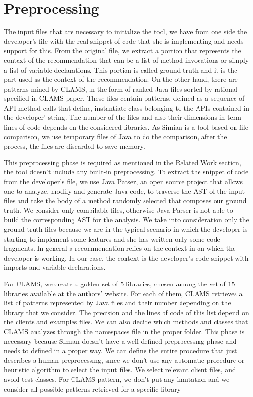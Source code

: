 \section{Preprocessing}

The input files that are necessary to initialize the tool, we have from one side the developer's file with the real snippet of code that she is implementing and needs support for this. From the original file, we extract a portion that represents the context of the recommendation that can be a list of method invocations or simply a list of variable declarations. This portion is called ground truth and it is the part used as the context of the recommendation. On the other hand, there are patterns mined by CLAMS, in the form of ranked Java files sorted by rational specified in CLAMS paper. These files contain patterns, defined as a sequence of API method calls that define, instantiate class belonging to the APIs contained in the developer' string. The number of the files and also their dimensions in term lines of code depends on the considered libraries. As Simian is a tool based on file comparison, we use temporary files of Java to do the comparison, after the process, the files are discarded to save memory. 

This preprocessing phase is required as mentioned in the Related Work section, the tool doesn't include any built-in preprocessing. To extract the snippet of code from the developer's file, we use Java Parser, an open source project that allows one to analyze, modify and generate Java code, to traverse the AST of the input files and take the body of a method randomly selected that composes our ground truth. We consider only compilable files, otherwise Java Parser is not able to build the corresponding AST for the analysis. We take into consideration only the ground truth files because we are in the typical scenario in which the developer is starting to implement some features and she has written only some code fragments. In general a recommendation relies on the context in on which the developer is working. In our case, the context is the developer's code snippet with imports and variable declarations.

For CLAMS, we create a golden set of $5$ libraries, chosen among the set of $15$ libraries available at the authors' website. For each of them, CLAMS retrieves a list of patterns represented by Java files and their number depending on the library that we consider. The precision and the lines of code of this list depend on the clients and examples files. We can also decide which methods and classes that CLAMS analyzes through the namespaces file in the proper folder. This phase is necessary because Simian doesn't have a well-defined preprocessing phase and needs to defined in a proper way. We can define the entire procedure that just describes a human preprocessing, since we don't use any automatic procedure or heuristic algorithm to select the input files. We select relevant client files, and avoid test classes. For CLAMS pattern, we don't put any limitation and we consider all possible patterns retrieved for a specific library.


